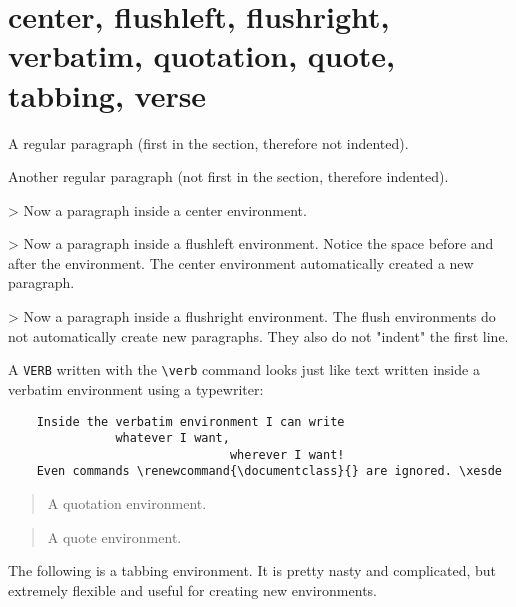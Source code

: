 \documentclass[environments-demo.tex]{subfiles}
\begin{document}
\section{center, flushleft, flushright, verbatim, quotation, quote, tabbing, verse}
A regular paragraph
(first in the section, therefore not indented).
\blindtext

Another regular paragraph
(not first in the section, therefore indented).
\blindtext

\begin{center}
> Now a paragraph inside a center environment.
\blindtext

\blindtext
\end{center}
\begin{flushleft}
> Now a paragraph inside a flushleft environment.
Notice the space before and after the environment.
The center environment automatically created a new paragraph.
\blindtext
\end{flushleft}

\begin{flushright}
> Now a paragraph inside a flushright environment.
The flush environments do not automatically create new paragraphs. They also do not "indent" the first line.
\blindtext
\end{flushright}

A \verb+VERB+ written with the \verb+\verb+ command
looks just like text written inside a verbatim environment
using a typewriter:

\begin{verbatim}
    Inside the verbatim environment I can write
               whatever I want,
                               wherever I want!
    Even commands \renewcommand{\documentclass}{} are ignored. \xesde
\end{verbatim}

\begin{quotation}
A quotation environment.
\blindtext
\end{quotation}

\begin{quote}
A quote environment.
\blindtext
\end{quote}

The following is a tabbing environment. It is pretty nasty and complicated,
but extremely flexible and useful for creating new environments.
\end{document}
